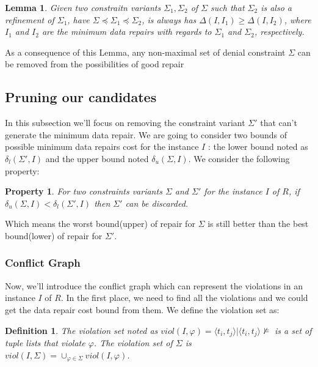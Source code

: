 \documentclass[letterpaper, 12pt]{report}
\newtheorem{mydef}{Definition}
\newtheorem{myprop}{Property}
\newtheorem{mylemma}{Lemma}
\begin{document}
\begin{mylemma}
 Given two constraitn variants $\Sigma_1,\Sigma_2$ of $\Sigma$ such that $\Sigma_2$
 is also a refinement of $\Sigma_1$, have $\Sigma \preceq \Sigma_1 \preceq \Sigma_2$, is always has $\Delta(I,I_1) \geq \Delta(I,I_2)$, where $I_1$ and $I_2$ are the minimum data repairs with regards to $\Sigma_1$ and $\Sigma_2$, respectively.
\end{mylemma}

As a consequence of this Lemma, any non-maximal set of denial constraint $\Sigma$ can be removed from the possibilities of good repair

\subsection{Pruning our candidates}

In this subsection we'll focus on removing the constraint variant $\Sigma '$ that can't generate the minimum data repair. We are going to  consider two bounds of possible minimum data repairs cost for the instance $I$ : the lower bound noted as $\delta_l(\Sigma',I)$ and the upper bound noted $\delta_u(\Sigma,I)$. We consider the following property:

\begin{myprop}
\label{boundRemove}
	For two constraints variants $\Sigma$ and $\Sigma'$ for the instance $I$ of $R$, if $\delta_u(\Sigma,I) < \delta_l(\Sigma',I)$ then $\Sigma'$ can be discarded.
\end{myprop}

Which means the worst bound(upper) of repair for $\Sigma$ is still better than the best bound(lower) of repair for $\Sigma'$.

\subsubsection{Conflict Graph}

Now, we'll introduce the conflict graph which can represent the violations in an instance $I$ of $R$. In the first place, we need to find all the violations and we could get the data repair cost bound from them. We define the violation set as: \cite{main}

\begin{mydef}
 The violation set noted as $viol(I,\varphi) = {\langle t_i,t_j \rangle | \langle t_i,t_j \rangle \not\models }$ is a set of tuple lists that violate $\varphi$. The violation set of $\Sigma$ is $viol(I,\Sigma) = \cup_{\varphi \in \Sigma}viol(I,\varphi)$.
\end{mydef}
\end{document}
